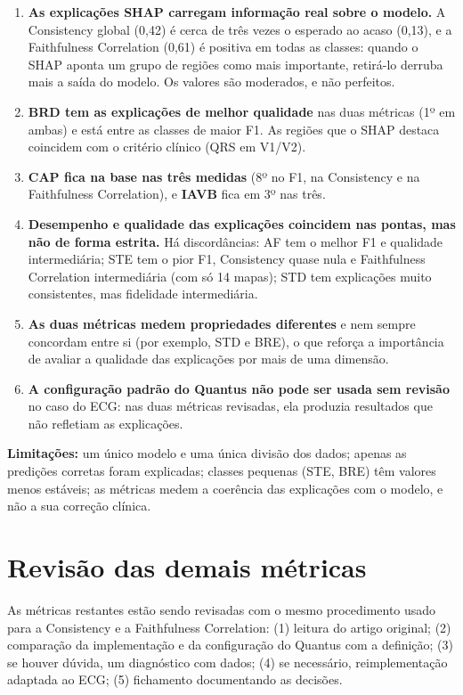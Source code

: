 \documentclass[11pt,a4paper]{article}
\begin{document}
\begin{enumerate}
    \item \textbf{As explicações SHAP carregam informação real sobre o modelo.} A Consistency global (0,42) é cerca de três vezes o esperado ao acaso (0,13), e a Faithfulness Correlation (0,61) é positiva em todas as classes: quando o SHAP aponta um grupo de regiões como mais importante, retirá-lo derruba mais a saída do modelo. Os valores são moderados, e não perfeitos.
    \item \textbf{BRD tem as explicações de melhor qualidade} nas duas métricas (1º em ambas) e está entre as classes de maior F1. As regiões que o SHAP destaca coincidem com o critério clínico (QRS em V1/V2).
    \item \textbf{CAP fica na base nas três medidas} (8º no F1, na Consistency e na Faithfulness Correlation), e \textbf{IAVB} fica em 3º nas três.
    \item \textbf{Desempenho e qualidade das explicações coincidem nas pontas, mas não de forma estrita.} Há discordâncias: AF tem o melhor F1 e qualidade intermediária; STE tem o pior F1, Consistency quase nula e Faithfulness Correlation intermediária (com só 14 mapas); STD tem explicações muito consistentes, mas fidelidade intermediária.
    \item \textbf{As duas métricas medem propriedades diferentes} e nem sempre concordam entre si (por exemplo, STD e BRE), o que reforça a importância de avaliar a qualidade das explicações por mais de uma dimensão.
    \item \textbf{A configuração padrão do Quantus não pode ser usada sem revisão} no caso do ECG: nas duas métricas revisadas, ela produzia resultados que não refletiam as explicações.
\end{enumerate}

\textbf{Limitações:} um único modelo e uma única divisão dos dados; apenas as predições corretas foram explicadas; classes pequenas (STE, BRE) têm valores menos estáveis; as métricas medem a coerência das explicações com o modelo, e não a sua correção clínica.

\section{Revisão das demais métricas}

As métricas restantes estão sendo revisadas com o mesmo procedimento usado para a Consistency e a Faithfulness Correlation: (1) leitura do artigo original; (2) comparação da implementação e da configuração do Quantus com a definição; (3) se houver dúvida, um diagnóstico com dados; (4) se necessário, reimplementação adaptada ao ECG; (5) fichamento documentando as decisões.
\end{document}
